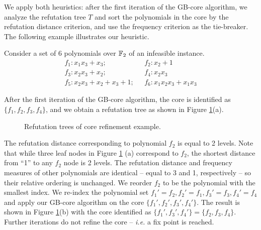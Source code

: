 
We apply both heuristics: after the first iteration of the GB-core
algorithm, we analyze the refutation tree $T$ and sort the polynomials
in the core by the refutation distance criterion, and use the
frequency criterion as the tie-breaker. The following example
illustrates our heuristic.  


\begin{Example} 
Consider a set of 6 polynomials over ${\mathbb{F}}_2$ of an
infeasible instance.
\begin{align*}
f_1: x_1x_3+x_3; & ~~~f_2: x_2 + 1\\
f_3: x_2x_3+x_2; & ~~~f_4: x_2x_3\\
f_5: x_2x_3 + x_2 + x_3 + 1; & ~~~f_6 : x_1x_2x_3 +x_1x_3
\end{align*}

After the first iteration of the GB-core algorithm, the core is
identified as $\{f_1, f_2,f_3,f_4\}$, and we obtain a
refutation tree as shown in Figure \ref{fig:refine}(a).  
\begin{figure}[bp]
\caption{Refutation trees of core refinement example.}
\label{fig:refine}
\end{figure}

The refutation distance corresponding to polynomial $f_2$ is equal to
2 levels. Note that while three leaf nodes in Figure \ref{fig:refine} (a)
correspond to $f_2$, the shortest distance from ``1'' to any $f_2$
node is 2 levels. The refutation distance and frequency measures of
other polynomials are identical -- equal to 3 and 1, respectively --
so their relative ordering is unchanged. We reorder $f_2$ to be the
polynomial with the  smallest index. We re-index the polynomial set 
$f_1'=f_2, f_2' = f_1, f_3' = f_3, f_4' = f_4$
and apply our GB-core algorithm on the core
$\{f_1',f_2',f_3',f_4'\}$. The result is shown in
Figure \ref{fig:refine}(b) with the core identified as $\{f_1', f_3',
f_4'\} = \{f_2,f_3,f_4\}$. Further iterations do not refine the core
-- {\it i.e.} a fix point is reached. 
\end{Example}

